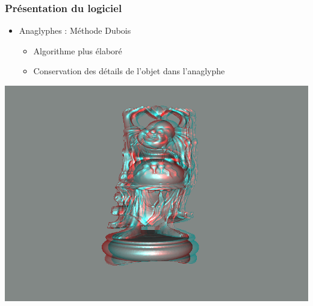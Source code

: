 \documentclass{beamer}
\begin{document}
\begin{frame}
\frametitle{Présentation du logiciel}
\begin{itemize}[label=$\bullet$]
\item Anaglyphes : Méthode Dubois \cite{algoDubois}
	\begin{itemize}[label=$\circ$]
	\item Algorithme plus élaboré
	\item Conservation des détails de l'objet dans l'anaglyphe 
	\end{itemize}
\end{itemize}
\centering
\includegraphics[scale=0.35]{happy_dubois.png}

\end{frame}
\end{document}

